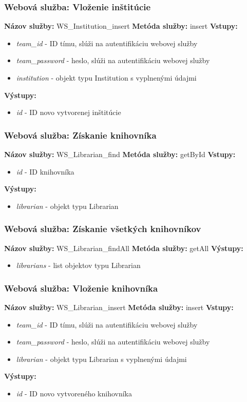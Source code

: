 \documentclass[10pt,oneside,slovak,a4paper]{article}
\begin{document}
\subsubsection{Webová služba: Vloženie inštitúcie}
\textbf{Názov služby:} WS\_Institution\_insert
\textbf{Metóda služby:} insert
\textbf{Vstupy:}
	\begin{itemize}
		\item \textit{team\_id} - ID tímu, slúži na autentifikáciu webovej služby
		\item \textit{team\_password} - heslo, slúži na autentifikáciu webovej služby
		\item \textit{institution} - objekt typu Institution s vyplnenými údajmi
	\end{itemize}
\textbf{Výstupy:}
	\begin{itemize}
		\item \textit{id} - ID novo vytvorenej inštitúcie
	\end{itemize}
	
\subsubsection{Webová služba: Získanie knihovníka}
\textbf{Názov služby:} WS\_Librarian\_find
\textbf{Metóda služby:} getById
\textbf{Vstupy:}
	\begin{itemize}
		\item \textit{id} - ID knihovníka
	\end{itemize}
\textbf{Výstupy:}
	\begin{itemize}
		\item \textit{librarian} - objekt typu Librarian
	\end{itemize}
	
\subsubsection{Webová služba: Získanie všetkých knihovníkov}
\textbf{Názov služby:} WS\_Librarian\_findAll
\textbf{Metóda služby:} getAll
\textbf{Výstupy:}
	\begin{itemize}
		\item \textit{librarians} - list objektov typu Librarian
	\end{itemize}
	
\subsubsection{Webová služba: Vloženie knihovníka}
\textbf{Názov služby:} WS\_Librarian\_insert
\textbf{Metóda služby:} insert
\textbf{Vstupy:}
	\begin{itemize}
		\item \textit{team\_id} - ID tímu, slúži na autentifikáciu webovej služby
		\item \textit{team\_password} - heslo, slúži na autentifikáciu webovej služby
		\item \textit{librarian} - objekt typu Librarian s vyplnenými údajmi
	\end{itemize}
\textbf{Výstupy:}
	\begin{itemize}
		\item \textit{id} - ID novo vytvoreného knihovníka
	\end{itemize}
	
\end{document}
